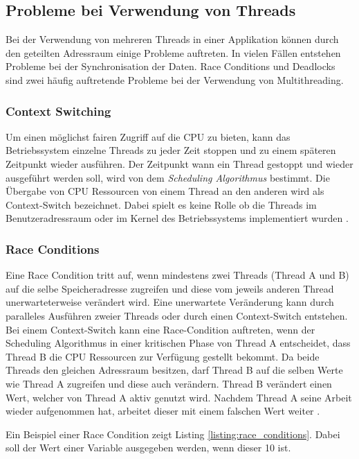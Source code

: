 \subsection{Probleme bei Verwendung von Threads}
Bei der Verwendung von mehreren Threads in einer Applikation können durch den geteilten Adressraum einige Probleme auftreten. In vielen Fällen entstehen Probleme bei der Synchronisation der Daten. Race Conditions und Deadlocks sind zwei häufig auftretende Probleme bei der Verwendung von Multithreading. 

\subsubsection{Context Switching}
Um einen möglichst fairen Zugriff auf die CPU zu bieten, kann das Betriebssystem einzelne Threads zu jeder Zeit stoppen und zu einem späteren Zeitpunkt wieder ausführen. Der Zeitpunkt wann ein Thread gestoppt und wieder ausgeführt werden soll, wird von dem \emph{Scheduling Algorithmus} bestimmt. Die Übergabe von CPU Ressourcen von einem Thread an den anderen wird als Context-Switch bezeichnet. Dabei spielt es keine Rolle ob die Threads im Benutzeradressraum oder im Kernel des Betriebssystems implementiert wurden \cite[p. 23]{Sto2013}.

\subsubsection{Race Conditions}

Eine Race Condition tritt auf, wenn mindestens zwei Threads (Thread A und B) auf die selbe Speicheradresse zugreifen und diese vom jeweils anderen Thread unerwarteterweise verändert wird. Eine unerwartete Veränderung kann durch paralleles Ausführen zweier Threads oder durch einen Context-Switch entstehen. Bei einem Context-Switch kann eine Race-Condition auftreten, wenn der Scheduling Algorithmus in einer kritischen Phase von Thread A entscheidet, dass Thread B die CPU Ressourcen zur Verfügung gestellt bekommt. Da beide Threads den gleichen Adressraum besitzen, darf Thread B auf die selben Werte wie Thread A zugreifen und diese auch verändern.  Thread B verändert einen Wert, welcher von Thread A aktiv genutzt wird. Nachdem Thread A seine Arbeit wieder aufgenommen hat, arbeitet dieser mit einem falschen Wert weiter \cite[p. 89]{tan09}. 

Ein Beispiel einer Race Condition zeigt Listing \ref{listing:race_conditions}. Dabei soll der Wert einer Variable ausgegeben werden, wenn dieser 10 ist.

